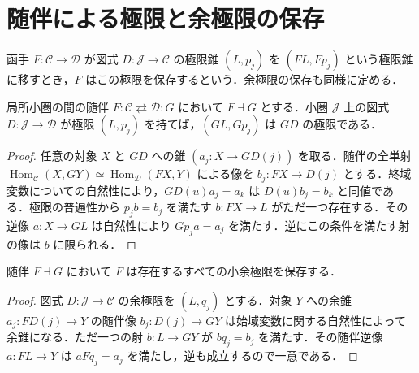 \section{随伴による極限と余極限の保存}
\begin{defn}[極限を保存する函手]
函手 $F:\mathcal C\to\mathcal D$ が図式 $D:\mathcal J\to\mathcal C$ の極限錐 $(L,p_j)$ を $(FL,Fp_j)$ という極限錐に移すとき，$F$ はこの極限を保存するという．余極限の保存も同様に定める．
\end{defn}
\begin{prop}[右随伴は極限を保存する]
局所小圏の間の随伴 $F:\mathcal C\rightleftarrows\mathcal D:G$ において $F\dashv G$ とする．小圏 $\mathcal J$ 上の図式 $D:\mathcal J\to\mathcal D$ が極限 $(L,p_j)$ を持てば，$(GL,Gp_j)$ は $GD$ の極限である．
\end{prop}
\begin{proof}
任意の対象 $X$ と $GD$ への錐 $(a_j:X\to GD(j))$ を取る．随伴の全単射 $\operatorname{Hom}_{\mathcal C}(X,GY)\simeq\operatorname{Hom}_{\mathcal D}(FX,Y)$ による像を $b_j:FX\to D(j)$ とする．終域変数についての自然性により，$GD(u)a_j=a_k$ は $D(u)b_j=b_k$ と同値である．極限の普遍性から $p_jb=b_j$ を満たす $b:FX\to L$ がただ一つ存在する．その逆像 $a:X\to GL$ は自然性により $Gp_ja=a_j$ を満たす．逆にこの条件を満たす射の像は $b$ に限られる．
\end{proof}
\begin{prop}[左随伴は余極限を保存する]
随伴 $F\dashv G$ において $F$ は存在するすべての小余極限を保存する．
\end{prop}
\begin{proof}
図式 $D:\mathcal J\to\mathcal C$ の余極限を $(L,q_j)$ とする．対象 $Y$ への余錐 $a_j:FD(j)\to Y$ の随伴像 $b_j:D(j)\to GY$ は始域変数に関する自然性によって余錐になる．ただ一つの射 $b:L\to GY$ が $bq_j=b_j$ を満たす．その随伴逆像 $a:FL\to Y$ は $aFq_j=a_j$ を満たし，逆も成立するので一意である．
\end{proof}
